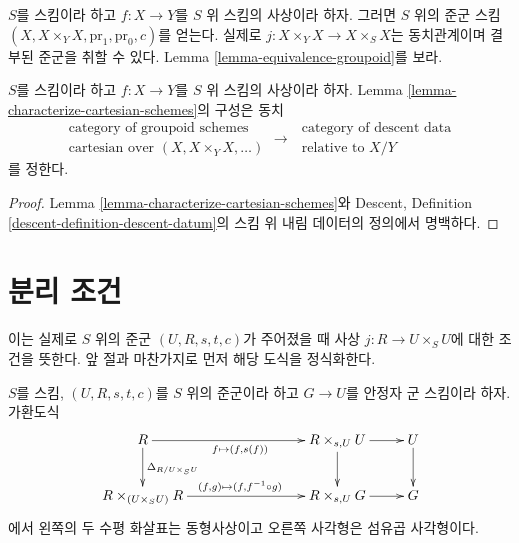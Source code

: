 \noindent
$S$를 스킴이라 하고 $f : X \to Y$를 $S$ 위 스킴의 사상이라 하자. 그러면 $S$ 위의 준군 스킴
$(X, X \times_Y X, \text{pr}_1, \text{pr}_0, c)$를 얻는다. 실제로
$j : X \times_Y X \to X \times_S X$는 동치관계이며 결부된 준군을 취할 수 있다. Lemma
\ref{lemma-equivalence-groupoid}를 보라.

\begin{lemma}
\label{lemma-cartesian-equivalent-descent-datum}
$S$를 스킴이라 하고 $f : X \to Y$를 $S$ 위 스킴의 사상이라 하자. Lemma
\ref{lemma-characterize-cartesian-schemes}의 구성은 동치
$$
\begin{matrix}
\text{category of groupoid schemes} \\
\text{cartesian over } (X, X \times_Y X, \ldots)
\end{matrix}
\longrightarrow
\begin{matrix}
\text{ category of descent data} \\
\text{ relative to } X/Y
\end{matrix}
$$
를 정한다.
\end{lemma}

\begin{proof}
Lemma \ref{lemma-characterize-cartesian-schemes}와 Descent, Definition
\ref{descent-definition-descent-datum}의 스킴 위 내림 데이터의 정의에서 명백하다.
\end{proof}







\section{분리 조건}
\label{section-separation}

\noindent
이는 실제로 $S$ 위의 준군 $(U, R, s, t, c)$가 주어졌을 때 사상 $j : R \to U \times_S U$에 대한 조건을 뜻한다.
앞 절과 마찬가지로 먼저 해당 도식을 정식화한다.

\begin{lemma}
\label{lemma-diagram-diagonal}
$S$를 스킴, $(U, R, s, t, c)$를 $S$ 위의 준군이라 하고 $G \to U$를 안정자 군 스킴이라 하자. 가환도식
$$
\xymatrix{
R \ar[d]^{\Delta_{R/U \times_S U}} \ar[rrr]_{f \mapsto (f, s(f))} & & &
R \times_{s, U} U \ar[d] \ar[r] & U \ar[d] \\
R \times_{(U \times_S U)} R \ar[rrr]^{(f, g) \mapsto (f, f^{-1} \circ g)} & & &
R \times_{s, U} G \ar[r] & G
}
$$
에서 왼쪽의 두 수평 화살표는 동형사상이고 오른쪽 사각형은 섬유곱 사각형이다.
\end{lemma}

